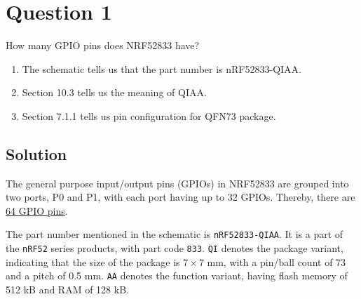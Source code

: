 \section*{Question 1}

How many GPIO pins does NRF52833 have?
\begin{enumerate}[label= (\alph*)]
    \item The schematic tells us that the part number is nRF52833-QIAA.\@
    \item Section 10.3 tells us the meaning of QIAA.\@
    \item Section 7.1.1 tells us pin configuration for QFN73 package.
\end{enumerate}

\subsection*{Solution}

The general purpose input/output pins (GPIOs) in NRF52833 are grouped into two ports, P0 and P1, with each port having up to 32 GPIOs.
Thereby, there are \underline{64 GPIO pins}.

The part number mentioned in the schematic is \texttt{nRF52833-QIAA}.
It is a part of the \texttt{nRF52} series products, with part code \texttt{833}.
\texttt{QI} denotes the package variant, indicating that the size of the package is \( 7\times 7 \) mm, with a pin/ball count of 73 and a pitch of 0.5 mm.
\texttt{AA} denotes the function variant, having flash memory of 512 kB and RAM of 128 kB.\@
